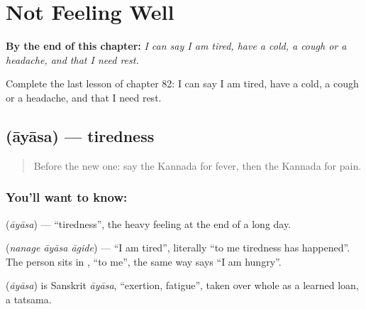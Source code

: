 
\chapter{Not Feeling Well}
\label{ch:ka-not-feeling-well}

\begin{chapteropening}
\textbf{By the end of this chapter:} \emph{I can say I am tired, have a cold, a cough or a headache, and that I need rest.}

Complete the last lesson of chapter 82: I can say I am tired, have a cold, a cough or a headache, and that I need rest.
\end{chapteropening}

\section[\texorpdfstring{\kn{ಆಯಾಸ} (āyāsa)}{ಆಯಾಸ (āyāsa)}]{ (āyāsa) — tiredness}

\label{lesson:KA-C82-tiredness}



\begin{quote}
Before the new one: say the Kannada for fever, then the Kannada for pain.
\end{quote}

\subsection*{You'll want to know: }
\textbf{} (\emph{āyāsa}) — \textquotedblleft{}tiredness\textquotedblright{}, the heavy feeling at the end of a long day.

\textbf{  } (\emph{nanage āyāsa āgide}) — \textquotedblleft{}I am tired\textquotedblright{}, literally \textquotedblleft{}to me tiredness has happened\textquotedblright{}. The person sits in \textbf{}, \textquotedblleft{}to me\textquotedblright{}, the same way \textbf{ } says \textquotedblleft{}I am hungry\textquotedblright{}.

\begin{cousinweb}
\textbf{} (\emph{āyāsa}) is Sanskrit \emph{āyāsa}, \textquotedblleft{}exertion, fatigue\textquotedblright{}, taken over whole as a learned loan, a tatsama.
\end{cousinweb}


